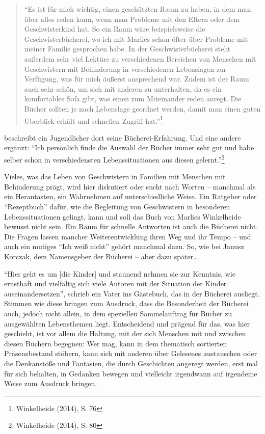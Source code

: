 \documentclass[a4paper,
fontsize=11pt,
oneside,
numbers=noperiodatend,
parskip=half-,
bibliography=totoc,
final
]{scrartcl}
\begin{document}
\begin{quote}
\enquote{Es ist für mich wichtig, einen geschützten Raum zu haben, in
dem man über alles reden kann, wenn man Probleme mit den Eltern oder dem
Geschwisterkind hat. So ein Raum wäre beispielsweise die
Geschwisterbücherei, wo ich mit Marlies schon öfter über Probleme mit
meiner Familie gesprochen habe. In der Geschwisterbücherei steht
außerdem sehr viel Lektüre zu verschiedenen Bereichen von Menschen mit
Geschwistern mit Behinderung in verschiedenen Lebenslagen zur Verfügung,
was für mich äußerst ansprechend war. Zudem ist der Raum auch sehr
schön, um sich mit anderen zu unterhalten, da es ein komfortables Sofa
gibt, was einen zum Miteinander reden anregt. Die Bücher sollten je nach
Lebenslage geordnet werden, damit man einen guten Überblick erhält und
schnellen Zugriff hat.}\footnote{Winkelheide (2014), S. 76}
\end{quote}

beschreibt ein Jugendlicher dort seine Bücherei-Erfahrung. Und eine
andere ergänzt: \enquote{Ich persönlich finde die Auswahl der Bücher
immer sehr gut und habe selber schon in verschiedensten
Lebenssituationen aus diesen gelernt.}\footnote{Winkelheide (2014), S.
  80}

Vieles, was das Leben von Geschwistern in Familien mit Menschen mit
Behinderung prägt, wird hier diskutiert oder sucht nach Worten --
manchmal als ein Herantasten, ein Wahrnehmen auf unterschiedliche Weise.
Ein Ratgeber oder \enquote{Rezeptbuch} dafür, wie die Begleitung von
Geschwistern in besonderen Lebenssituationen gelingt, kann und soll das
Buch von Marlies Winkelheide bewusst nicht sein. Ein Raum für schnelle
Antworten ist auch die Bücherei nicht. Die Fragen lassen mancher
Weiterentwicklung ihren Weg und ihr Tempo -- und auch ein mutiges
\enquote{Ich weiß nicht} gehört manchmal dazu. So, wie bei Janusz
Korczak, dem Namensgeber der Bücherei -- aber dazu später\ldots{}

\enquote{Hier geht es um {[}die Kinder{]} und staunend nehmen sie zur
Kenntnis, wie ernsthaft und vielfältig sich viele Autoren mit der
Situation der Kinder auseinandersetzen}, schrieb ein Vater ins
Gästebuch, das in der Bücherei ausliegt. Stimmen wie diese bringen zum
Ausdruck, dass die Besonderheit der Bücherei auch, jedoch nicht allein,
in dem speziellen Sammelauftrag für Bücher zu ausgewählten Lebensthemen
liegt. Entscheidend und prägend für das, was hier geschieht, ist vor
allem die Haltung, mit der sich Menschen mit und zwischen diesen Büchern
begegnen: Wer mag, kann in dem thematisch sortierten Präsenzbestand
stöbern, kann sich mit anderen über Gelesenes austauschen oder die
Denkanstöße und Fantasien, die durch Geschichten angeregt werden, erst
mal für sich behalten, in Gedanken bewegen und vielleicht irgendwann auf
irgendeine Weise zum Ausdruck bringen.
\end{document}
